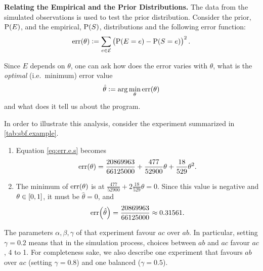 \documentclass[adraft,copyright,creativecommons]{eptcs}
\newcommand{\at}[1]{\ensuremath{\!\del{#1}}}
\newcommand{\fml}[1]{\ensuremath{{\cal #1}}}
\newcommand{\pr}[1]{\ensuremath{\mathrm{P}\at{#1}}}
\newcommand{\err}[1]{\ensuremath{\mathrm{err}\at{#1}}}
\begin{document}
\noindent\textbf{Relating the Empirical and the Prior Distributions.} The data from the simulated observations is used to test the prior distribution. Consider the prior, $\pr{E}$, and the empirical, $\pr{S}$, distributions and the following error function:
\begin{equation}
    \err{\theta} := \sum_{e\in\fml{E}} \del{\pr{E = e} - \pr{S = e}}^2.\label{eq:err.e.s}
\end{equation}

Since $E$ depends on $\theta$, one can ask how does the error varies with $\theta$, what is  the \emph{optimal} (i.e.\ minimum) error value
          \begin{equation}
              \hat{\theta} := \arg\min_\theta \err{\theta}\label{eq:opt.err}
          \end{equation}
          and what does it tell us about the program.

In order to illustrate this analysis, consider the experiment summarized in \cref{tab:sbf.example}.

\begin{enumerate}
    \item Equation \eqref{eq:err.e.s} becomes
          $$
              \err{\theta} = \frac{20869963}{66125000} + \frac{477}{52900}\theta + \frac{18}{529}\theta^2.
          $$
    \item The minimum of $\err{\theta}$ is at $\frac{477}{52900} + 2\frac{18}{529}\theta = 0$. Since this value is negative and $\theta \in \intcc{0,1}$, it must be $\hat{\theta} = 0$, and
          $$
              \err{\hat{\theta}} = \frac{20869963}{66125000} \approx 0.31561.
          $$
\end{enumerate}

The parameters $\alpha, \beta, \gamma$ of that experiment favour $ac$ over $ab$. In particular, setting $\gamma = 0.2$ means that in the simulation process, choices between $ab$ and $ac$ favour $ac$, 4 to 1. For completeness sake, we also describe one experiment that favours $ab$ over $ac$ (setting $\gamma=0.8$) and one balanced ($\gamma=0.5$).
\end{document}
